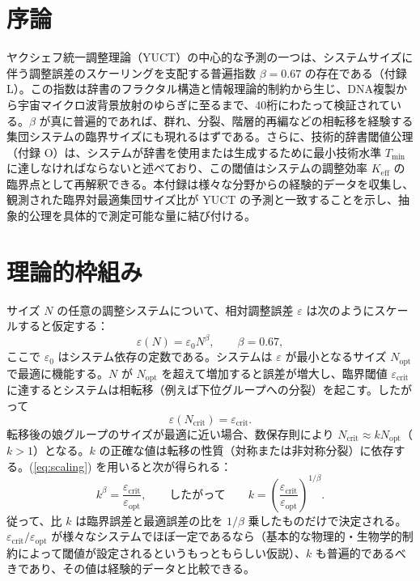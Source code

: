 \documentclass[12pt]{article}
\theoremstyle{remark}
\newcommand{\Keff}{K_{\mathrm{eff}}}
\newcommand{\Tmin}{T_{\min}}
\begin{document}
	\tableofcontents
	\newpage
	
	\section{序論}
	\label{sec:intro}
	
	ヤクシェフ統一調整理論（YUCT）の中心的な予測の一つは、システムサイズに伴う調整誤差のスケーリングを支配する普遍指数 \(\beta = 0.67\) の存在である（付録 L）。この指数は辞書のフラクタル構造と情報理論的制約から生じ、DNA複製から宇宙マイクロ波背景放射のゆらぎに至るまで、40桁にわたって検証されている。\(\beta\) が真に普遍的であれば、群れ、分裂、階層的再編などの相転移を経験する集団システムの臨界サイズにも現れるはずである。さらに、技術的辞書閾値公理（付録 O）は、システムが辞書を使用または生成するために最小技術水準 \(\Tmin\) に達しなければならないと述べており、この閾値はシステムの調整効率 \(\Keff\) の臨界点として再解釈できる。本付録は様々な分野からの経験的データを収集し、観測された臨界対最適集団サイズ比が YUCT の予測と一致することを示し、抽象的公理を具体的で測定可能な量に結び付ける。
	
	\section{理論的枠組み}
	\label{sec:theory}
	
	サイズ \(N\) の任意の調整システムについて、相対調整誤差 \(\varepsilon\) は次のようにスケールすると仮定する：
	\begin{equation}
		\varepsilon(N) = \varepsilon_0 N^{\beta}, \qquad \beta = 0.67,
		\label{eq:scaling}
	\end{equation}
	ここで \(\varepsilon_0\) はシステム依存の定数である。システムは \(\varepsilon\) が最小となるサイズ \(N_{\text{opt}}\) で最適に機能する。\(N\) が \(N_{\text{opt}}\) を超えて増加すると誤差が増大し、臨界閾値 \(\varepsilon_{\text{crit}}\) に達するとシステムは相転移（例えば下位グループへの分裂）を起こす。したがって
	\begin{equation}
		\varepsilon(N_{\text{crit}}) = \varepsilon_{\text{crit}}.
	\end{equation}
	転移後の娘グループのサイズが最適に近い場合、数保存則により \(N_{\text{crit}} \approx k N_{\text{opt}}\)（\(k > 1\)）となる。\(k\) の正確な値は転移の性質（対称または非対称分裂）に依存する。(\ref{eq:scaling}) を用いると次が得られる：
	\begin{equation}
		k^{\beta} = \frac{\varepsilon_{\text{crit}}}{\varepsilon_{\text{opt}}}, 
		\qquad\text{したがって}\qquad 
		k = \left( \frac{\varepsilon_{\text{crit}}}{\varepsilon_{\text{opt}}} \right)^{1/\beta}.
		\label{eq:k}
	\end{equation}
	従って、比 \(k\) は臨界誤差と最適誤差の比を \(1/\beta\) 乗したものだけで決定される。\(\varepsilon_{\text{crit}}/\varepsilon_{\text{opt}}\) が様々なシステムでほぼ一定であるなら（基本的な物理的・生物学的制約によって閾値が設定されるというもっともらしい仮説）、\(k\) も普遍的であるべきであり、その値は経験的データと比較できる。
	
\end{document}
